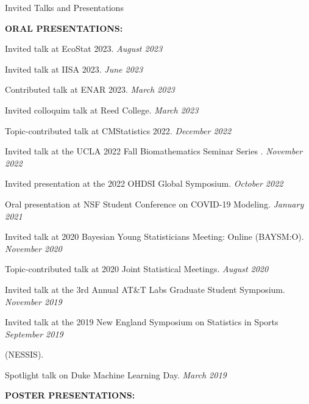 \documentclass{resume} %
\begin{document}
\begin{rSection}{Invited Talks and Presentations}

\textbf{ORAL PRESENTATIONS:}

Invited talk at EcoStat 2023. \hfill {\em August 2023}

Invited talk at IISA 2023.  \hfill {\em June 2023}

%

Contributed talk at ENAR 2023. \hfill {\em March 2023}

Invited colloquim talk at Reed College. \hfill {\em March 2023}

Topic-contributed talk at CMStatistics 2022. \hfill {\em December 2022}

Invited talk at the UCLA 2022 Fall Biomathematics Seminar Series . \hfill {\em November 2022}

Invited presentation at the 2022 OHDSI Global Symposium.  \hfill {\em October 2022}

{Oral presentation at NSF Student Conference on COVID-19 Modeling.} \hfill {\em January 2021}

{Invited talk at 2020 Bayesian Young Statisticians Meeting: Online (BAYSM:O).} \hfill {\em November 2020}

{Topic-contributed talk at 2020 Joint Statistical Meetings. } \hfill {\em August 2020}

{Invited talk at the 3rd Annual AT\&T Labs Graduate Student Symposium.} \hfill {\em November 2019}


{Invited talk at the 2019 New England Symposium on Statistics in Sports} \hfill {\em September 2019}

\vspace{-0.1in}
 (NESSIS).
 
Spotlight talk on Duke Machine Learning Day. \hfill {\em March 2019}




\medskip
\textbf{POSTER PRESENTATIONS:}


\end{rSection}
\end{document}
